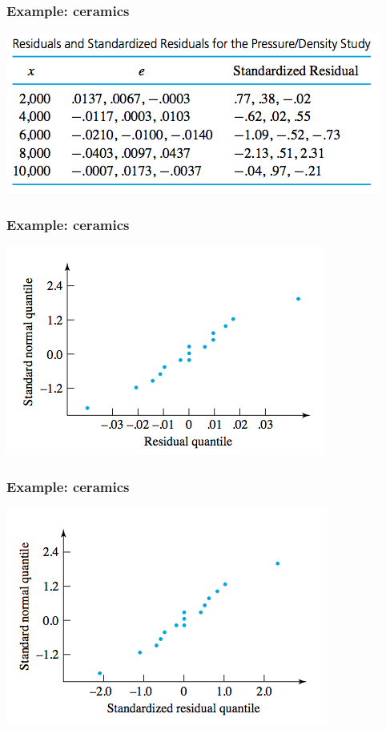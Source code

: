 \documentclass[handout]{beamer}\usepackage{graphicx, color}
\numberwithin{equation}{section}
\begin{document}
\begin{frame}
\frametitle{Example: ceramics}
\begin{center}
 \includegraphics{../../fig/stdres.png}
\end{center}
\end{frame}

\begin{frame}
\frametitle{Example: ceramics}
\begin{center}
 \includegraphics{../../fig/ceramrawres.png}
\end{center}
\end{frame}

\begin{frame}
\frametitle{Example: ceramics}
\begin{center}
 \includegraphics{../../fig/ceramstdres.png}
\end{center}
\end{frame}
\end{document}
